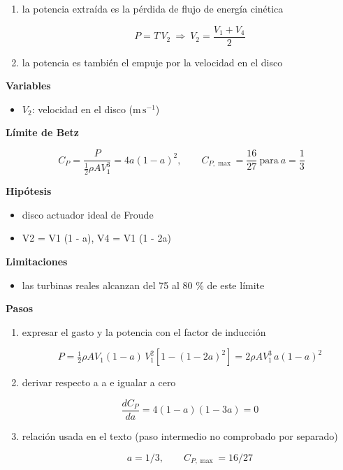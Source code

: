 \documentclass[10pt,openany]{book}
\begin{document}
\begin{tcolorbox}[title={Desarrollos del modelo}, studiumdef, breakable]
\begin{enumerate}
\[
T = \dot m\,(V_1 - V_4),\qquad P = \tfrac12\dot m\,(V_1^{2} - V_4^{2})
\]
\item
la potencia extraída es la pérdida de flujo de energía cinética

\[
P = T\,V_2\ \Rightarrow\ V_2 = \frac{V_1 + V_4}{2}
\]
\item
la potencia es también el empuje por la velocidad en el disco
\end{enumerate}

\noindent\textbf{Variables}
\begin{itemize}
\item $V_{2}$: velocidad en el disco ($\mathrm{m}\,\mathrm{s}^{-1}$)
\end{itemize}



\noindent\textbf{Límite de Betz}

\begin{equation}
C_P = \frac{P}{\tfrac12\rho A V_1^{3}} = 4a(1 - a)^{2},\qquad C_{P,\max} = \frac{16}{27}\ \text{para}\ a = \frac13
\label{eq:c09-betz}
\end{equation}

\noindent\textbf{Hipótesis}
\begin{itemize}
\item disco actuador ideal de Froude
\item V2 = V1 (1 - a), V4 = V1 (1 - 2a)
\end{itemize}

\noindent\textbf{Limitaciones}
\begin{itemize}
\item las turbinas reales alcanzan del 75 al 80 \% de este límite
\end{itemize}

\noindent\textbf{Pasos}
\begin{enumerate}
\item
expresar el gasto y la potencia con el factor de inducción

\[
P = \tfrac12\rho A V_1 (1 - a)\,V_1^{2}\left[1 - (1 - 2a)^{2}\right] = 2\rho A V_1^{3}\,a(1 - a)^{2}
\]
\item
derivar respecto a a e igualar a cero

\[
\frac{dC_P}{da} = 4(1 - a)(1 - 3a) = 0
\]
\item
relación usada en el texto (paso intermedio no comprobado por separado)

\[
a = 1/3,\qquad C_{P,\max} = 16/27
\]
\end{enumerate}


\end{tcolorbox}
\end{document}
